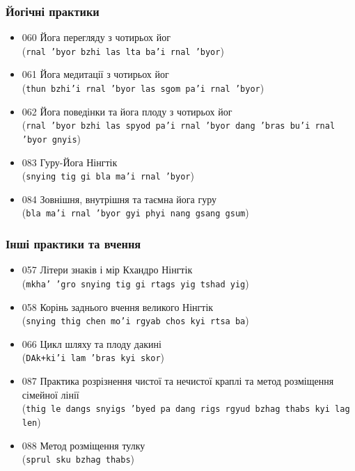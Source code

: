 \documentclass{article}
\begin{document}
\subsubsection{Йогічні практики}

\begingroup\raggedright
\begin{itemize}
\item 060 Йога перегляду з чотирьох йог \\ (\texttt{rnal 'byor bzhi las lta ba'i rnal 'byor})
\item 061 Йога медитації з чотирьох йог \\ (\texttt{thun bzhi'i rnal 'byor las sgom pa'i rnal 'byor})
\item 062 Йога поведінки та йога плоду з чотирьох йог \\ (\texttt{rnal 'byor bzhi las spyod pa'i rnal 'byor dang 'bras bu'i rnal 'byor gnyis})
\item 083 Гуру-Йога Нінгтік \\ (\texttt{snying tig gi bla ma'i rnal 'byor})
\item 084 Зовнішня, внутрішня та таємна йога гуру \\ (\texttt{bla ma'i rnal 'byor gyi phyi nang gsang gsum})
\end{itemize}
\endgroup

\subsubsection{Інші практики та вчення}

\begingroup\raggedright
\begin{itemize}
\item 057 Літери знаків і мір Кхандро Нінгтік \\ (\texttt{mkha' 'gro snying tig gi rtags yig tshad yig})
\item 058 Корінь заднього вчення великого Нінгтік \\ (\texttt{snying thig chen mo'i rgyab chos kyi rtsa ba})
\item 066 Цикл шляху та плоду дакині \\ (\texttt{DAk+ki'i lam 'bras kyi skor})
\item 087 Практика розрізнення чистої та нечистої краплі та метод розміщення сімейної лінії \\ (\texttt{thig le dangs snyigs 'byed pa dang rigs rgyud bzhag thabs kyi lag len})
\item 088 Метод розміщення тулку \\ (\texttt{sprul sku bzhag thabs})
\end{itemize}
\endgroup
\end{document}
